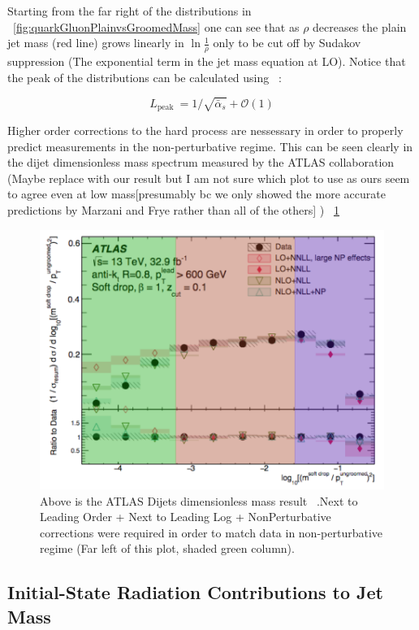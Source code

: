  Starting from the far right of the distributions in ~\ref{fig:quarkGluonPlainvsGroomedMass} one can see that as $\rho$ decreases the plain jet mass (red line) grows linearly in $\ln \frac{1}{\rho}$ only to be cut off by Sudakov suppression (The exponential term in the jet mass equation at LO). Notice that the peak of the distributions can be calculated using ~\cite{mmdt}:\newline

\begin{equation}
L_{\text {peak }}=1 / \sqrt{\bar{\alpha}_{s}}+\mathcal{O}(1)
\end{equation}
 




Higher order corrections to the hard process are nessessary in order to properly predict measurements in the non-perturbative regime. This can be seen clearly in the dijet dimensionless mass spectrum measured by the ATLAS collaboration (Maybe replace with our result but I am not sure which plot to use as ours seem to agree even at low mass[presumably bc we only showed the more accurate predictions by Marzani and Frye rather than all of the others] ) ~\ref{fig:atlasDijet}


\begin{figure}[htb]
\centering
\includegraphics[width=.60\textwidth]{visuals/ATLAS-rho-highorder.png}
\caption{Above is the ATLAS Dijets dimensionless mass result ~\cite{Dreyer:2018nbf}.Next to Leading Order + Next to Leading Log + NonPerturbative corrections were required in order to match data in non-perturbative regime (Far left of this plot, shaded green column).}
\label{fig:atlasDijet}
\end{figure}






\subsection{Initial-State Radiation Contributions to Jet Mass }\label{sec:jetmassISR}


